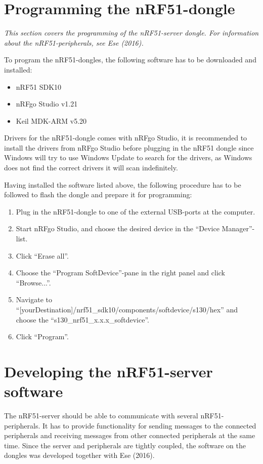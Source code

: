 \section{Programming the nRF51-dongle}
\textit{This section covers the programming of the nRF51-server dongle. For information about the nRF51-peripherals, see Ese (2016).}

\label{sec:nrfrequirements}
To program the nRF51-dongles, the following software has to be downloaded and installed:
\begin{itemize}
    \item nRF51 SDK10\cite{nrf51sdk}
    \item nRFgo Studio v1.21\cite{nrfgo}
    \item Keil MDK-ARM v5.20\cite{keil}
\end{itemize}
Drivers for the nRF51-dongle comes with nRFgo Studio, it is recommended to install the drivers from nRFgo Studio before plugging in the nRF51 dongle since Windows will try to use Windows Update to search for the drivers, as Windows does not find the correct drivers it will scan indefinitely.

Having installed the software listed above, the following procedure has to be followed to flash the dongle and prepare it for programming:
\begin{enumerate}
    \item Plug in the nRF51-dongle to one of the external USB-ports at the computer.
    \item Start nRFgo Studio, and choose the desired device in the ``Device Manager''-list.
    \item Click ``Erase all''.
    \item Choose the ``Program SoftDevice''-pane in the right panel and click ``Browse...''.
    \item Navigate to ``[yourDestination]/nrf51\_sdk10/components/softdevice/s130/hex'' and choose the ``s130\_nrf51\_x.x.x\_softdevice''.
    \item Click ``Program''.
\end{enumerate}

\section{Developing the nRF51-server software}
The nRF51-server should be able to communicate with several nRF51-peripherals. It has to provide functionality for sending messages to the connected peripherals and receiving messages from other connected peripherals at the same time. Since the server and peripherals are tightly coupled, the software on the dongles was developed together with Ese (2016).

